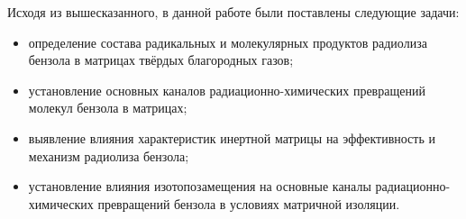 { Исходя из вышесказанного, в данной работе были поставлены следующие задачи:
 \begin{itemize}
\item определение состава радикальных и молекулярных продуктов радиолиза бензола в матрицах твёрдых благородных газов;
\item установление основных каналов радиационно-химических превращений молекул бензола в матрицах;
\item выявление влияния характеристик инертной матрицы на эффективность и механизм радиолиза бензола;
\item установление влияния изотопозамещения на основные каналы радиационно-химических превращений бензола в условиях матричной изоляции.
\end{itemize}
 
 }


 
 
 
 
 
 
 
 
 
 
 
 
 

 
 
 
 
 
 
 
 

